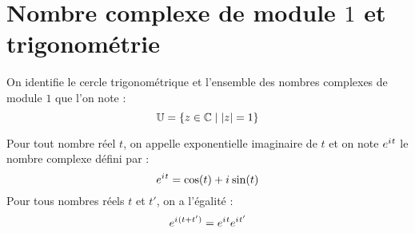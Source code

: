 \section{Nombre complexe de module \(1\) et trigonométrie}
\begin{defi}
	On identifie le cercle trigonométrique et l’ensemble des nombres complexes de module \(1\) que l’on note : \[\mathbb{U} = \left\lbrace z \in \mathbb{C} \;\middle|\; \left\lvert z\right\rvert = 1\right\rbrace\]
\end{defi}

\begin{defprop}
	Pour tout nombre réel \(t\), on appelle exponentielle imaginaire de \(t\) et on note \(e^{i\mkern1mu t}\) le nombre complexe défini par :
	\[e^{i\mkern1mu t} = \cos(t) + i\mkern1mu \sin(t) \]
	Pour tous nombres réels \(t\) et \(t'\), on a l’égalité : \[e^{i\mkern1mu(t+t')} = e^{i\mkern1mu t}e^{i\mkern1mu t'} \]
\end{defprop}



